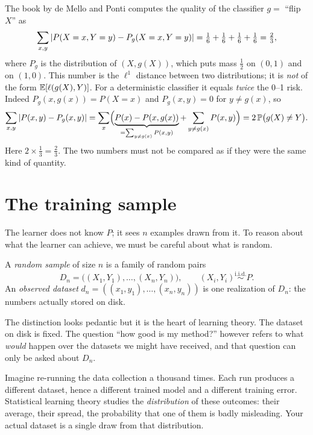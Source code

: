 \begin{notechapter}
\begin{pitfall}
The book by de Mello and Ponti computes the quality of the classifier $g = $ ``flip $X$'' as
\[
  \sum_{x,y} \left|P(X=x, Y=y) - P_g(X=x, Y=y)\right| = \tfrac16 + \tfrac16 + \tfrac16 + \tfrac16 = \tfrac23,
\]
where $P_g$ is the distribution of $(X, g(X))$, which puts mass $\frac12$ on
$(0,1)$ and on $(1,0)$. This number is the $\ell^1$ distance between two
distributions; it is \emph{not} of the form $\mathbb{E}[\ell(g(X),Y)]$. For a
deterministic classifier it equals \emph{twice} the 0--1 risk. Indeed
$P_g(x, g(x)) = P(X=x)$ and $P_g(x,y) = 0$ for $y \neq g(x)$, so
\[
  \sum_{x,y} \left|P(x, y) - P_g(x, y)\right|
  = \sum_x \Bigl( \underbrace{P(x) - P(x, g(x))}_{=\sum_{y\neq g(x)}P(x,y)}
     + \sum_{y \neq g(x)} P(x,y) \Bigr)
  = 2\,\mathbb{P}\bigl(g(X) \neq Y\bigr).
\]
Here $2 \times \frac13 = \frac23$. The two numbers must not be compared as if
they were the same kind of quantity.
\end{pitfall}

\section{The training sample}\label{learning-problem:sec:sample}

The learner does not know $P$; it sees $n$ examples drawn from it. To reason
about what the learner can achieve, we must be careful about what is random.

\begin{definition}\label{learning-problem:def:sample}
A \emph{random sample} of size $n$ is a family of random pairs
\[
  D_n = \bigl((X_1, Y_1), \dots, (X_n, Y_n)\bigr),
  \qquad (X_i, Y_i) \overset{\text{i.i.d.}}{\sim} P .
\]
An \emph{observed dataset} $d_n = ((x_1, y_1), \dots, (x_n, y_n))$ is one
realization of $D_n$: the numbers actually stored on disk.
\end{definition}

The distinction looks pedantic but it is the heart of learning theory. The
dataset on disk is fixed. The question ``how good is my method?'' however
refers to what \emph{would} happen over the datasets we might have received,
and that question can only be asked about $D_n$.

\begin{intuition}
Imagine re-running the data collection a thousand times. Each run produces a
different dataset, hence a different trained model and a different training
error. Statistical learning theory studies the \emph{distribution} of these
outcomes: their average, their spread, the probability that one of them is
badly misleading. Your actual dataset is a single draw from that distribution.
\end{intuition}


\end{notechapter}
